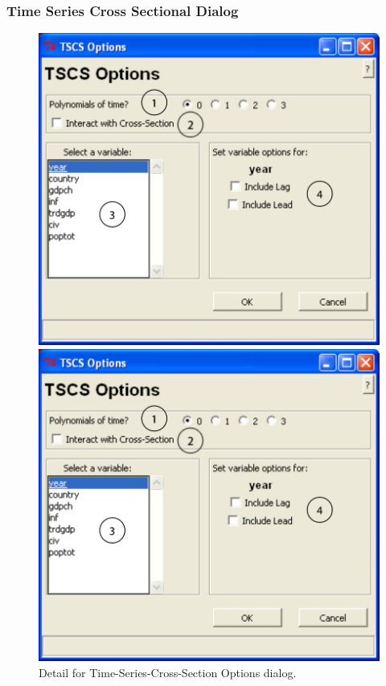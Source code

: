 \documentclass[12pt,titlepage]{article}
\begin{document}
\subsubsection{Time Series Cross Sectional Dialog}
\label{sec:tscsdiag}
\begin{figure}[ht]
 \begin{htmlonly} 
  \centering \includegraphics[scale=1]{tscs} 
 \end{htmlonly}
 \begin{latexonly}
  \centering \includegraphics[scale=.75]{tscs}
 \end{latexonly}
  \caption{Detail for Time-Series-Cross-Section Options dialog.}
\end{figure}
\end{document}
